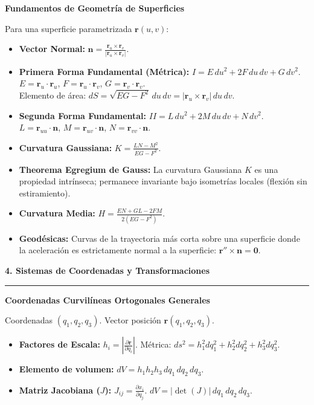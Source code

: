 \documentclass[10pt, landscape, twocolumn]{article}
\newcommand{\cheatsheetsection}[1]{
    \vspace{0.8em}
    {\color{themeblue}\large\bfseries #1} \par
    \vspace{-0.4em}
    {\color{themeblue}\rule{\linewidth}{1pt}} \par
    \vspace{0.3em}
}
\newcommand{\cheatsheetsubsection}[1]{
    \vspace{0.5em}
    {\color{themeblue}\normalsize\bfseries #1} \par
    \vspace{0.2em}
}
\begin{document}
\vspace{-2}
\cheatsheetsubsection{Fundamentos de Geometría de Superficies}
Para una superficie parametrizada $\mathbf{r}(u,v)$:
\begin{itemize}[leftmargin=*, nosep]
    \item \textbf{Vector Normal:} $\mathbf{n} = \frac{\mathbf{r}_u \times \mathbf{r}_v}{|\mathbf{r}_u \times \mathbf{r}_v|}$.
    \item \textbf{Primera Forma Fundamental (Métrica):} $I = E\,du^2 + 2F\,du\,dv + G\,dv^2$. \\
    $E = \mathbf{r}_u \cdot \mathbf{r}_u$, $F = \mathbf{r}_u \cdot \mathbf{r}_v$, $G = \mathbf{r}_v \cdot \mathbf{r}_v$. \\
    Elemento de área: $dS = \sqrt{EG - F^2} \, du \, dv = |\mathbf{r}_u \times \mathbf{r}_v| \, du \, dv$.
    \item \textbf{Segunda Forma Fundamental:} $II = L\,du^2 + 2M\,du\,dv + N\,dv^2$. \\
    $L = \mathbf{r}_{uu} \cdot \mathbf{n}$, $M = \mathbf{r}_{uv} \cdot \mathbf{n}$, $N = \mathbf{r}_{vv} \cdot \mathbf{n}$.
    \item \textbf{Curvatura Gaussiana:} $K = \frac{LN - M^2}{EG - F^2}$. 
    \item \textbf{Theorema Egregium de Gauss:} La curvatura Gaussiana $K$ es una propiedad intrínseca; permanece invariante bajo isometrías locales (flexión sin estiramiento).
    \item \textbf{Curvatura Media:} $H = \frac{EN + GL - 2FM}{2(EG - F^2)}$.
    \item \textbf{Geodésicas:} Curvas de la trayectoria más corta sobre una superficie donde la aceleración es estrictamente normal a la superficie: $\mathbf{r}'' \times \mathbf{n} = \mathbf{0}$.
\end{itemize}

\cheatsheetsection{4. Sistemas de Coordenadas y Transformaciones}

\cheatsheetsubsection{Coordenadas Curvilíneas Ortogonales Generales}
Coordenadas $(q_1, q_2, q_3)$. Vector posición $\mathbf{r}(q_1, q_2, q_3)$.
\begin{itemize}[leftmargin=*, nosep]
    \item \textbf{Factores de Escala:} $h_i = \left| \frac{\partial \mathbf{r}}{\partial q_i} \right|$. Métrica: $ds^2 = h_1^2 dq_1^2 + h_2^2 dq_2^2 + h_3^2 dq_3^2$.
    \item \textbf{Elemento de volumen:} $dV = h_1 h_2 h_3 \, dq_1 \, dq_2 \, dq_3$.
    \item \textbf{Matriz Jacobiana ($J$):} $J_{ij} = \frac{\partial x_i}{\partial q_j}$. $dV = |\det(J)| \, dq_1 \, dq_2 \, dq_3$.
\end{itemize}
\end{document}
